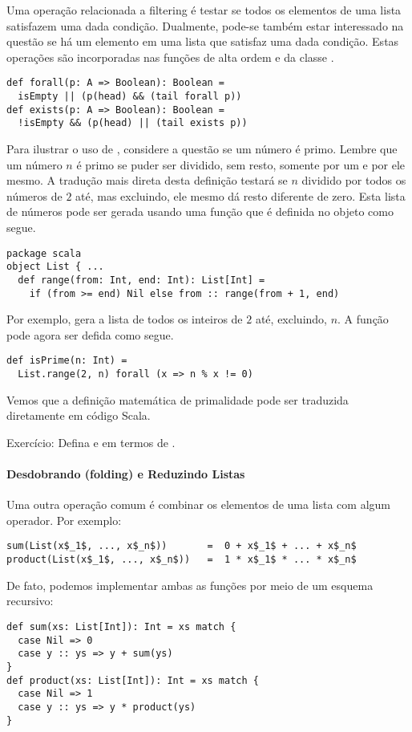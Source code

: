 Uma operação relacionada a filtering é testar se todos os elementos de uma lista satisfazem
uma dada condição. Dualmente, pode-se também estar interessado na questão se há um elemento 
em uma lista que satisfaz uma dada condição. Estas operações são incorporadas nas funções 
de alta ordem  e  da classe .
\begin{lstlisting}
def forall(p: A => Boolean): Boolean =
  isEmpty || (p(head) && (tail forall p))
def exists(p: A => Boolean): Boolean =
  !isEmpty && (p(head) || (tail exists p))
\end{lstlisting}

Para ilustrar o uso de , considere a questão se um número é primo. Lembre que um
número $n$ é primo se puder ser dividido, sem resto, somente por um e por ele mesmo. A 
tradução mais direta desta definição testará se $n$ dividido por todos os números de $2$ até, mas 
excluindo, ele mesmo dá resto diferente de zero. Esta lista de números pode ser gerada usando uma 
função  que é definida no objeto  como segue. 
\begin{lstlisting}
package scala
object List { ...
  def range(from: Int, end: Int): List[Int] =
    if (from >= end) Nil else from :: range(from + 1, end)
\end{lstlisting}

Por exemplo,  gera a lista de todos os inteiros de $2$ até, excluindo, $n$.
A função  pode agora ser defida como segue. 
\begin{lstlisting}
def isPrime(n: Int) =
  List.range(2, n) forall (x => n % x != 0)
\end{lstlisting}
Vemos que a definição matemática de primalidade pode ser traduzida diretamente em código Scala.

Exercício: Defina  e  em termos de .

\paragraph{Desdobrando (folding) e Reduzindo Listas}
Uma outra operação comum é combinar os elementos de uma lista com algum operador. Por exemplo:
\begin{lstlisting}
sum(List(x$_1$, ..., x$_n$))       =  0 + x$_1$ + ... + x$_n$
product(List(x$_1$, ..., x$_n$))   =  1 * x$_1$ * ... * x$_n$
\end{lstlisting}

De fato, podemos implementar ambas as funções por meio de um esquema recursivo:
\begin{lstlisting}
def sum(xs: List[Int]): Int = xs match {
  case Nil => 0
  case y :: ys => y + sum(ys)
}
def product(xs: List[Int]): Int = xs match {
  case Nil => 1
  case y :: ys => y * product(ys)
}
\end{lstlisting}

